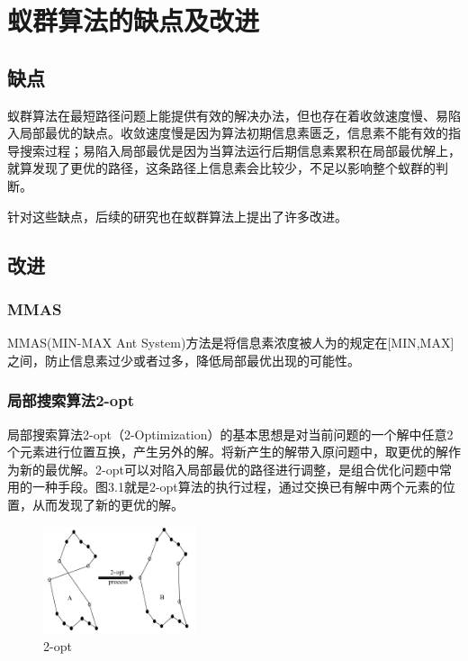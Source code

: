 \documentclass[a4paper,12pt]{report}
\begin{document}
\chapter{蚁群算法的缺点及改进}
\pagestyle{fancy}


\begin{spacing}{1.5}
\section{缺点}
	蚁群算法在最短路径问题上能提供有效的解决办法，但也存在着收敛速度慢、易陷入局部最优的缺点。收敛速度慢是因为算法初期信息素匮乏，信息素不能有效的指导搜索过程；易陷入局部最优是因为当算法运行后期信息素累积在局部最优解上，就算发现了更优的路径，这条路径上信息素会比较少，不足以影响整个蚁群的判断。

	针对这些缺点，后续的研究也在蚁群算法上提出了许多改进。

		

\section{改进}
	
\subsection{MMAS}
	MMAS(MIN-MAX Ant System)方法是将信息素浓度被人为的规定在[MIN,MAX]之间，防止信息素过少或者过多，降低局部最优出现的可能性。

\subsection{局部搜索算法2-opt}
	局部搜索算法2-opt（2-Optimization）的基本思想是对当前问题的一个解中任意2个元素进行位置互换，产生另外的解。将新产生的解带入原问题中，取更优的解作为新的最优解。2-opt可以对陷入局部最优的路径进行调整，是组合优化问题中常用的一种手段。图3.1就是2-opt算法的执行过程，通过交换已有解中两个元素的位置，从而发现了新的更优的解。
	\begin{figure}[htbp]
		\centering
		\includegraphics[width=0.4\textwidth]{pic/ant5.jpg}
		\caption{2-opt}
		\label{fig:pt1}
	\end{figure}



\end{spacing}
\end{document}
